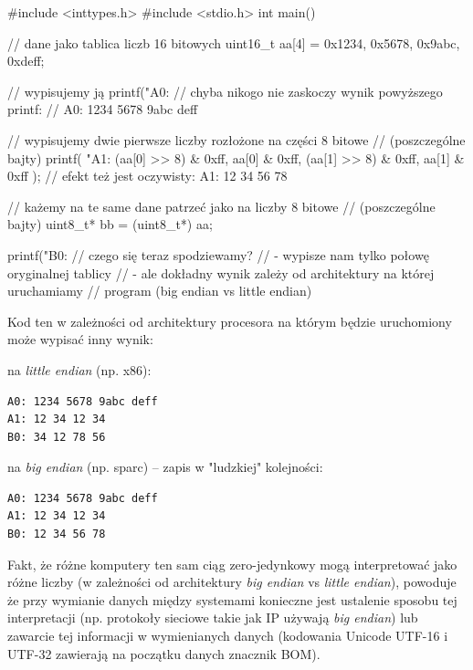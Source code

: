 \begin{CodeFrame*}[c]{}
#include <inttypes.h>
#include <stdio.h>
int main() {
    // dane jako tablica liczb 16 bitowych
    uint16_t aa[4] = {0x1234, 0x5678, 0x9abc, 0xdeff};
    
    // wypisujemy ją
    printf("A0: %
    // chyba nikogo nie zaskoczy wynik powyższego printf:
    //   A0: 1234 5678 9abc deff
    
    // wypisujemy dwie pierwsze liczby rozłożone na części 8 bitowe
    // (poszczególne bajty)
    printf(
        "A1: %
        (aa[0] >> 8) & 0xff, aa[0] & 0xff,
        (aa[1] >> 8) & 0xff, aa[1] & 0xff
    );
    // efekt też jest oczywisty:  A1: 12 34 56 78
    
    // każemy na te same dane patrzeć jako na liczby 8 bitowe
    // (poszczególne bajty)
    uint8_t* bb = (uint8_t*) aa;
    
    printf("B0: %
    // czego się teraz spodziewamy?
    //  - wypisze nam tylko połowę oryginalnej tablicy
    //  - ale dokładny wynik zależy od architektury na której uruchamiamy
    //    program (big endian vs little endian)
}
\end{CodeFrame*}

Kod ten w zależności od architektury procesora na którym będzie uruchomiony może wypisać inny wynik:

\vspace{3pt}
\begin{minipage}[t]{0.33\textwidth}
na \emph{little endian} (np. x86):
\begin{Verbatim}
A0: 1234 5678 9abc deff
A1: 12 34 12 34
B0: 34 12 78 56
\end{Verbatim}
\end{minipage}
\hfill
\begin{minipage}[t]{0.63\textwidth}
na \emph{big endian} (np. sparc) – zapis w "ludzkiej" kolejności:
\begin{Verbatim}
A0: 1234 5678 9abc deff
A1: 12 34 12 34
B0: 12 34 56 78
\end{Verbatim}
\end{minipage}
\vspace{8pt}

Fakt, że różne komputery ten sam ciąg zero-jedynkowy mogą interpretować jako różne liczby (w zależności od architektury \textit{big endian} vs \textit{little endian}), powoduje że przy wymianie danych między systemami konieczne jest ustalenie sposobu tej interpretacji (np. protokoły sieciowe takie jak IP używają \textit{big endian}) lub zawarcie tej informacji w wymienianych danych (kodowania Unicode UTF-16 i UTF-32 zawierają na początku danych znacznik BOM).
